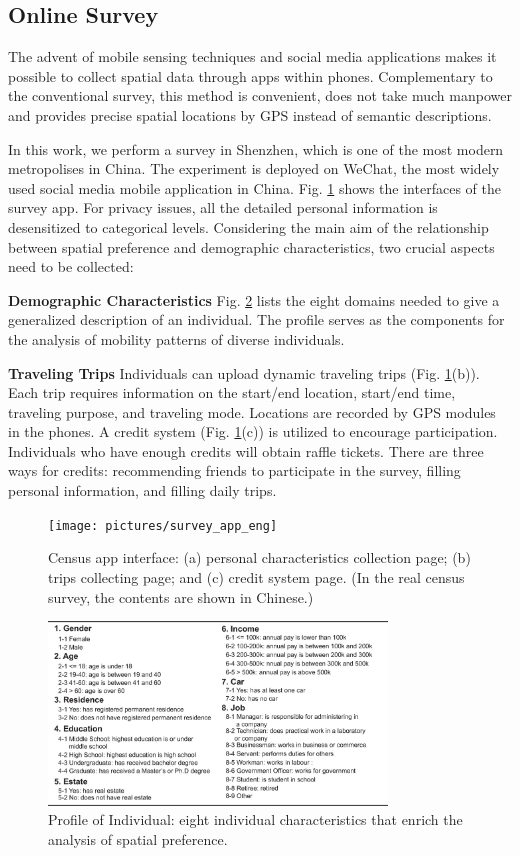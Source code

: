 \documentclass{ieeeaccess}
\begin{document}
\subsection{Online Survey}

The advent of mobile sensing techniques and social media applications makes it possible to collect spatial data through apps within phones. Complementary to the conventional survey, this method is convenient, does not take much manpower and provides precise spatial locations by GPS instead of semantic descriptions.

In this work, we perform a survey in Shenzhen, which is one of the most modern metropolises in China. The experiment is deployed on WeChat, the most widely used social media mobile application in China. Fig. \ref{fig:app} shows the interfaces of the survey app. For privacy issues, all the detailed personal information is desensitized to categorical levels. Considering the main aim of the relationship between spatial preference and demographic characteristics, two crucial aspects need to be collected:

\textbf{Demographic Characteristics} Fig. \ref{fig:data_over} lists the eight domains needed to give a generalized description of an individual. The profile serves as the components for the analysis of mobility patterns of diverse individuals.

\textbf{Traveling Trips} Individuals can upload dynamic traveling trips (Fig. \ref{fig:app}(b)). Each trip requires information on the start/end location, start/end time, traveling purpose, and traveling mode. Locations are recorded by GPS modules in the phones. A credit system (Fig. \ref{fig:app}(c)) is utilized to encourage participation. Individuals who have enough credits will obtain raffle tickets. There are three ways for credits: recommending friends to participate in the survey, filling personal information, and filling daily trips.


\begin{figure}
 \centering
 \texttt{[image: pictures/survey\_app\_eng]}
  \captionsetup{justification=centering}
 \caption{Census app interface: (a) personal characteristics collection page; (b) trips collecting page; and (c) credit system page. (In the real census survey, the contents are shown in Chinese.)}
 \label{fig:app}
\end{figure}


\begin{figure}
 \centering
 \includegraphics[width=9cm]{pictures/data_over}
 \captionsetup{justification=centering}
 \caption{Profile of Individual: eight individual characteristics that enrich the analysis of spatial preference.}
 \label{fig:data_over}
\end{figure}
\end{document}

